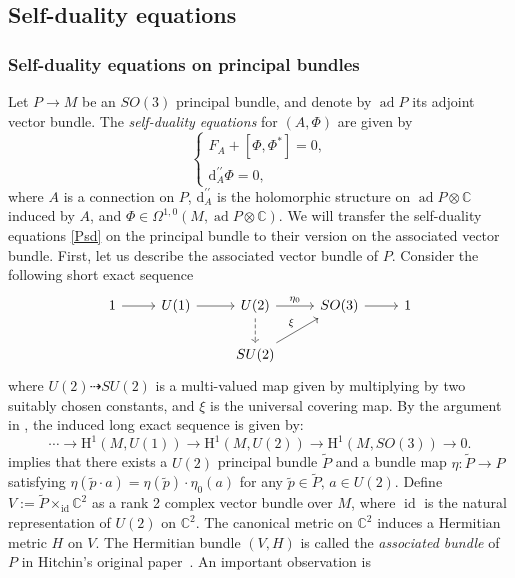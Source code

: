 \documentclass[a4paper]{amsart}
\theoremstyle{definition}
\theoremstyle{remark}
\numberwithin{equation}{section}
\begin{document}
\subsection{Self-duality equations}

\subsubsection{Self-duality equations on principal bundles}

Let $P \to M$ be an $SO(3)$ principal bundle, and denote by $\operatorname{ad} P$ its adjoint vector bundle. The \textit{self-duality equations} for $(A, \Phi)$ are given by  
\begin{equation}
\begin{cases}
F_A + [\Phi, \Phi^*] = 0, \\
\mathrm{d}_A^{\prime\prime} \Phi = 0,
\end{cases}\label{Psd}
\end{equation}
where $A$ is a connection on $P$, $\mathrm{d}_A^{\prime\prime}$ is the holomorphic structure on $\operatorname{ad} P\otimes\mathbb{C}$ induced by $A$, and $\Phi \in \Omega^{1,0}(M, \operatorname{ad} P \otimes \mathbb{C})$. We will transfer the self-duality equations \eqref{Psd} on the principal bundle to their version on the associated vector bundle. First, let us describe the associated vector bundle of $P$. Consider the following short exact sequence 
\[
\begin{tikzcd}
1 \arrow[r] & U(1) \arrow[r] & U(2) \arrow[r, "\eta_0"] \arrow[d, dashed] & SO(3) \arrow[r] & 1 \\
            &                & SU(2) \arrow[ur, "\xi"]
\end{tikzcd}
\]
where $U(2) \dashrightarrow SU(2)$ is a multi-valued map given by multiplying by two suitably chosen constants, and $\xi$ is the universal covering map. By the argument in \cite[Appendix A, p. 373]{lawson1989spin}, the induced long exact sequence is given by:
\[
\cdots \to \mathrm{H}^1(M, U(1)) \to \mathrm{H}^1(M, U(2)) \to \mathrm{H}^1(M, SO(3)) \to 0.
\]
implies that there exists a $U(2)$ principal bundle $\tilde{P}$ and a bundle map $\eta: \tilde{P} \to P$ satisfying $\eta(\tilde{p} \cdot a) = \eta(\tilde{p}) \cdot \eta_0(a)$ for any $\tilde{p} \in \tilde{P}, \, a \in U(2).$ Define $V := \tilde{P} \times_{\operatorname{id}} \mathbb{C}^2$ as a rank 2 complex vector bundle over $M$, where $\operatorname{id}$ is the natural representation of $U(2)$ on $\mathbb{C}^2$. The canonical metric on $\mathbb{C}^2$ induces a Hermitian metric $H$ on $V$. The Hermitian bundle $(V, H)$ is called the \textit{associated bundle} of $P$ in Hitchin's original paper~\cite[Section~2]{hitchin1987self}. An important observation is
\end{document}

